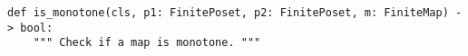 \begin{verbatim}
def is_monotone(cls, p1: FinitePoset, p2: FinitePoset, m: FiniteMap) -> bool:
    """ Check if a map is monotone. """
\end{verbatim}